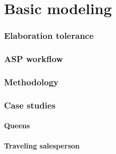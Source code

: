 \part{Basic modeling}

\section{Elaboration tolerance}

\section{ASP workflow}


\section{Methodology}


\section{Case studies}
% 
\subsection{Queens}


\subsection{Traveling salesperson}

% 
